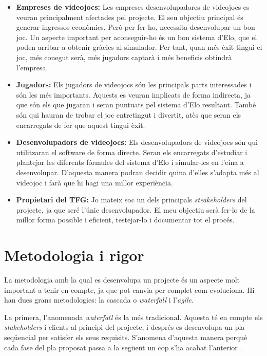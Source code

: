 \documentclass[a4paper]{article}
\begin{document}
\begin{itemize}
    \item \textbf{Empreses de videojocs:} Les empreses desenvolupadores de videojocs es veuran principalment afectades pel projecte. El seu objectiu principal és generar ingressos econòmics. Però per fer-ho, necessita desenvolupar un bon joc. Un aspecte important per aconseguir-ho és un bon sistema d'Elo, que el poden arribar a obtenir gràcies al simulador. Per tant, quan més èxit tingui el joc, més conegut serà, més jugadors captarà i més beneficis obtindrà l'empresa.
    
    \item \textbf{Jugadors:} Els jugadors de videojocs són les principals parts interessades i són les més importants. Aquests es veuran implicats de forma indirecta, ja que són els que jugaran i seran puntuats pel sistema d'Elo resultant. També són qui hauran de trobar el joc entretingut i divertit, atès que seran els encarregats de fer que aquest tingui èxit. 
    
    \item \textbf{Desenvolupadors de videojocs:} Els desenvolupadors de videojocs són qui utilitzaran el software de forma directe. Seran els encarregats d'estudiar i plantejar les diferents fórmules del sistema d'Elo i simular-les en l'eina a desenvolupar. D'aquesta manera podran decidir quina d'elles s'adapta més al videojoc i farà que hi hagi una millor experiència.
    
    \item \textbf{Propietari del TFG:} Jo mateix soc un dels principals \textit{steakeholders} del projecte, ja que seré l'únic desenvolupador. El meu objectiu serà fer-lo de la millor forma possible i eficient, testejar-lo i documentar tot el procés.
    
\end{itemize}

\newpage
\section{Metodologia i rigor}
La metodologia amb la qual es desenvolupa un projecte és un aspecte molt important a tenir en compte, ja que pot canvia per complet com evoluciona. Hi han dues grans metodologies: la cascada o \textit{waterfall} i l'\textit{agile}.

La primera, l'anomenada \textit{waterfall} és la més tradicional. Aquesta té en compte els \textit{stakeholders} i clients al principi del projecte, i després es desenvolupa un pla seqüencial per satisfer els seus requisits. S'anomena d'aquesta manera perquè cada fase del pla proposat passa a la següent un cop s'ha acabat l'anterior \cite{waterfallModel}.
\end{document}

